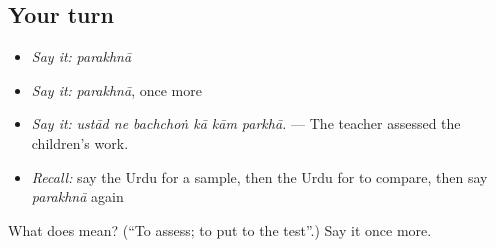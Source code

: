 \subsection*{Your turn}
\begin{itemize}
\raggedright
  \item \emph{Say it:} \emph{parakhnā}
  \item \emph{Say it:} \emph{parakhnā}, once more
  \item \emph{Say it:} \emph{ustād ne bachchoṅ kā kām parkhā.} — The teacher assessed the children's work.
  \item \emph{Recall:} say the Urdu for a sample, then the Urdu for to compare, then say \emph{parakhnā} again
\end{itemize}

\begin{tcolorbox}[breakable,colback=teal!4,colframe=teal!35!black,title={Before you move on}]
What does  mean? (\textquotedblleft{}To assess; to put to the test\textquotedblright{}.) Say it once more.
\end{tcolorbox}
